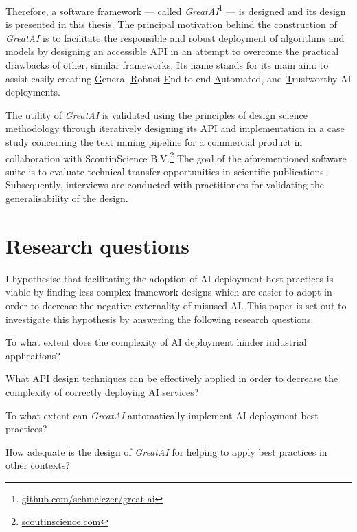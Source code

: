 Therefore, a software framework --- called \textit{GreatAI}\footnote{\href{https://github.com/schmelczer/great-ai}{github.com/schmelczer/great-ai}} --- is designed and its design is presented in this thesis. The principal motivation behind the construction of \textit{GreatAI} is to facilitate the responsible and robust deployment of algorithms and models by designing an accessible API in an attempt to overcome the practical drawbacks of other, similar frameworks. Its name stands for its main aim: to assist easily creating \underline{G}eneral \underline{R}obust \underline{E}nd-to-end \underline{A}utomated, and \underline{T}rustworthy AI deployments.

The utility of \textit{GreatAI} is validated using the principles of design science methodology \cite{wieringa2014design} through iteratively designing its API and implementation in a case study concerning the text mining pipeline for a commercial product in collaboration with ScoutinScience B.V.\footnote{\href{https://scoutinscience.com/}{scoutinscience.com}} The goal of the aforementioned software suite is to evaluate technical transfer opportunities in scientific publications. Subsequently, interviews are conducted with practitioners for validating the generalisability of the design.

\section{Research questions}

I hypothesise that facilitating the adoption of AI deployment best practices is viable by finding less complex framework designs which are easier to adopt in order to decrease the negative externality of misused AI. This paper is set out to investigate this hypothesis by answering the following research questions. 

\begin{rqlist}
  \item To what extent does the complexity of AI deployment hinder industrial applications?
  \item What API design techniques can be effectively applied in order to decrease the complexity of correctly deploying AI services?
  \item To what extent can \textit{GreatAI} automatically implement AI deployment best practices?
  \item How adequate is the design of \textit{GreatAI} for helping to apply best practices in other contexts?
\end{rqlist}

